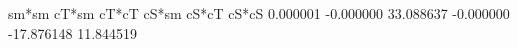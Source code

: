                                    sm*sm               cT*sm               cT*cT               cS*sm               cS*cT               cS*cS
                                0.000001           -0.000000           33.088637           -0.000000          -17.876148           11.844519